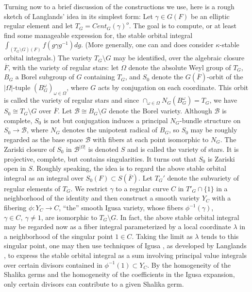 \documentclass[12pt,letterpaper]{amsart}
\newcommand{\ovF}{\overline{F}}
\begin{document}
Turning now to a brief discussion of the constructions we use,
here is a rough sketch of Langlands' idea in its simplest form:
Let $\gamma\in G(F)$ be an elliptic regular element and let
$T_G=Cent_G(\gamma)^o$. The goal is to compute,
or at least find some manageable expression for, the stable orbital
integral $\int_{(T_G\setminus G)(F)}f(g\gamma g^{-1})dg$.
(More generally, one can and does consider $\kappa$-stable orbital
integrals.) The variety $T_G\setminus G$
may be identified, over the algebraic closure
$\overline{F}$, with the variety of regular stars: let
$\Omega$ denote the absolute Weyl group of $T_G$,
$B_G$ a Borel subgroup of $G$
containing $T_G$, and $S_0$ denote the $G(\ovF)$-orbit of the
$|\Omega|$-tuple $(B_G^\omega)_{\omega\in \Omega}$, where
$G$ acts by conjugation on each coordinate. This orbit is called the
variety of regular stars and since
$\cap_{\omega\in \Omega}N_G(B_G^\omega)=T_G$,
we have $S_0\cong T_G\setminus G$ over $\ovF$. Let
${\mathcal B}\cong B_G\setminus G$
denote the Borel variety. Although ${\mathcal B}$ is complete,
$S_0$ is not but
conjugation induces a principal $N_G$-bundle structure on
$S_0\rightarrow {\mathcal B}$, where $N_G$ denotes
the unipotent radical of $B_G$,
so $S_0$ may be roughly regarded as
the base space ${\mathcal B}$ with fibers at each point isomorphic to
$N_G$. The Zariski closure of
$S_0$ in ${\mathcal B}^{|\Omega|}$ is denoted $S$ and is called the variety of
stars. It is projective, complete, but contains singularities.
It turns out that $S_0$ is Zariski open in $S$.
Roughly speaking, the idea is to regard the above stable orbital integral
as an integral over $S_0(F)\subset S(\ovF)$. Let $T_G'$
denote the subvariety of regular elements of $T_G$. We
restrict $\gamma$ to a regular curve $C$ in $T'_G\cap \{1\}$
in a neighborhood of the identity and then construct a smooth variety $Y_C$
with a fibering $\phi:Y_C\rightarrow C$, ``the''
smooth Igusa variety, whose fibers
$\phi^{-1}(\gamma)$, $\gamma\in C,\ \gamma\not= 1$,
are isomorphic to $T_G\setminus G$. In fact, the above stable orbital integral
may be regarded now as a fiber integral parameterized by a
local coordinate $\lambda$ in a neighborhood of the singular point $1\in C$.
Taking the limit as $\lambda$ tends to this singular point,
one may then use techniques of Igusa \cite{Ig78}, as developed
by Langlands \cite{La83}, to express the stable orbital integral
as a sum involving principal value integrals over certain divisors
contained in $\phi^{-1}(1) \subset Y_C$. By the homogeneity
of the Shalika germs and the
homogeneity of the coefficients in the Igusa expansion, only certain
divisors can contribute to a given Shalika germ.
\end{document}
